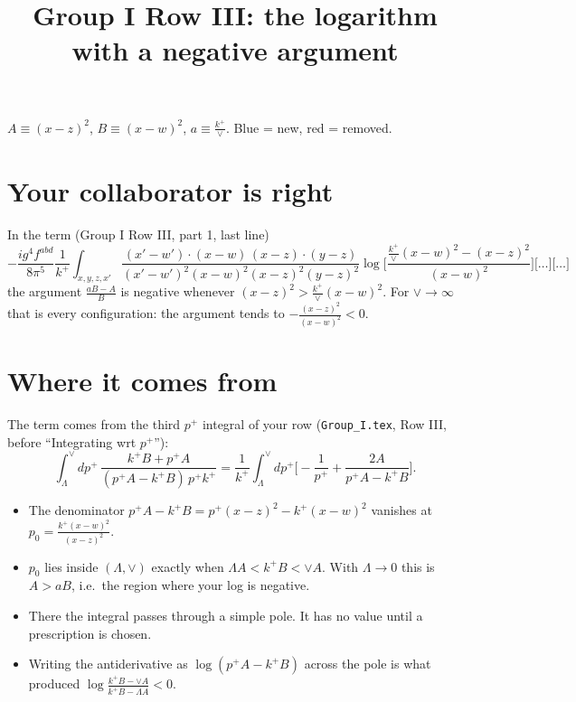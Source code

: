 \documentclass[10pt]{article}
\title{Group I Row III: the logarithm with a negative argument}
\date{}
\newcommand{\new}[1]{{\color{blue}#1}}
\newcommand{\old}[1]{{\color{red}#1}}
\begin{document}
\maketitle
\noindent $A\equiv(x-z)^2$, $B\equiv(x-w)^2$, $a\equiv\frac{k^+}{\vee}$. \new{Blue} = new, \old{red} = removed.

\section{Your collaborator is right}
In the term (Group I Row III, part 1, last line)
\begin{equation*}
-\frac{ig^{4}f^{abd}}{8\pi^{5}}\frac{1}{k^{+}}\int_{x,y,z,x'}\frac{(x'-w')\cdot (x-w)\,(x-z)\cdot (y-z)}{(x'-w')^{2}(x-w)^{2}(x-z)^{2}(y-z)^{2}}\log\Big[\frac{\frac{k^{+}}{\vee}(x-w)^{2}-(x-z)^{2}}{(x-w)^{2}}\Big]\big[\dots\big]\big[\dots\big]
\end{equation*}
the argument $\frac{aB-A}{B}$ is negative whenever $(x-z)^2>\frac{k^+}{\vee}(x-w)^2$. For $\vee\to\infty$ that is every configuration: the argument tends to $-\frac{(x-z)^2}{(x-w)^2}<0$.

\section{Where it comes from}
The term comes from the third $p^+$ integral of your row (\texttt{Group\_I.tex}, Row III, before ``Integrating wrt $p^+$''):
\begin{equation*}
\int_\Lambda^\vee dp^+\,\frac{k^+B+p^+A}{(p^+A-k^+B)\,p^+k^+}
=\frac{1}{k^+}\int_\Lambda^\vee dp^+\Big[-\frac{1}{p^+}+\frac{2A}{p^+A-k^+B}\Big].
\end{equation*}
\begin{itemize}
\item The denominator $p^+A-k^+B=p^+(x-z)^2-k^+(x-w)^2$ vanishes at $p_0=\frac{k^+(x-w)^2}{(x-z)^2}$.
\item $p_0$ lies inside $(\Lambda,\vee)$ exactly when $\Lambda A<k^+B<\vee A$. With $\Lambda\to0$ this is $A>aB$, i.e.\ the region where your log is negative.
\item There the integral passes through a simple pole. It has no value until a prescription is chosen.
\item Writing the antiderivative as $\log(p^+A-k^+B)$ across the pole is what produced $\log\frac{k^+B-\vee A}{k^+B-\Lambda A}<0$.
\end{itemize}
\end{document}
